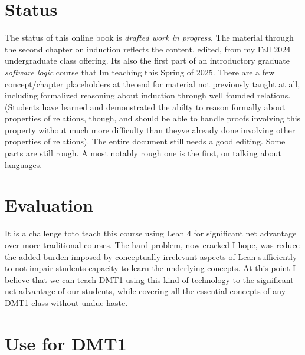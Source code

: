\documentclass{book}
\begin{document}
\hypertarget{pandoc.profile.debug__pandoc__debug__src__preface.md__status}{%
\section*{Status}\label{pandoc.profile.debug__pandoc__debug__src__preface.md__status}}

The status of this online book is \emph{drafted work in progress}. The material through the second
chapter on induction reflects the content, edited, from my Fall 2024 undergraduate class offering.
It\textquotesingle s also the first part of an introductory graduate \emph{software logic} course that I\textquotesingle m teaching
this Spring of 2025. There are a few concept/chapter placeholders at the end for material not previously taught at all, including formalized reasoning about induction through well founded relations. (Students have learned and demonstrated the abilty to reason formally about properties of relations, though, and should be able to handle proofs involving this property without much more difficulty than they\textquotesingle ve already done involving other properties of relations). The entire document still needs a good editing. Some parts are still rough. A most notably rough one is the first, on talking about languages.

\hypertarget{pandoc.profile.debug__pandoc__debug__src__preface.md__evaluation}{%
\section*{Evaluation}\label{pandoc.profile.debug__pandoc__debug__src__preface.md__evaluation}}

It is a challenge toto teach this course using Lean 4 for significant net advantage over more traditional courses. The hard problem, now cracked I hope, was reduce the added burden imposed by conceptually irrelevant aspects of Lean sufficiently to not impair students\textquotesingle{} capacity to learn the underlying concepts. At this point I believe that we can teach DMT1 using this kind of technology to the significant net advantage of our students, while covering all the essential concepts of any DMT1 class without undue haste.

\hypertarget{pandoc.profile.debug__pandoc__debug__src__preface.md__use-for-dmt1}{%
\section*{Use for DMT1}\label{pandoc.profile.debug__pandoc__debug__src__preface.md__use-for-dmt1}}
\end{document}
